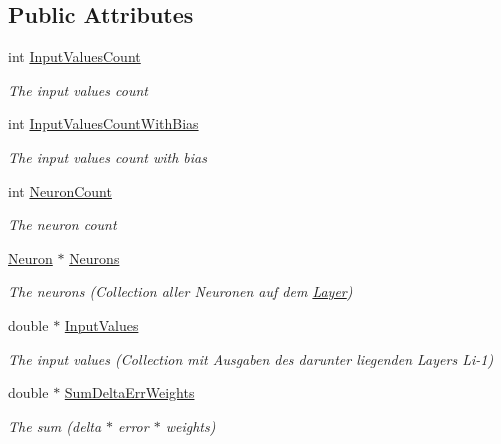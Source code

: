 \subsection*{Public Attributes}
\begin{DoxyCompactItemize}
\item 
int \hyperlink{class_n_n_t_lib_1_1_layer_a5c968ed46039cbaa69f217c71fd74855}{Input\+Values\+Count}
\begin{DoxyCompactList}\small\item\em The input values count \end{DoxyCompactList}\item 
int \hyperlink{class_n_n_t_lib_1_1_layer_a3537c5d904445f7bebac1136c59e0503}{Input\+Values\+Count\+With\+Bias}
\begin{DoxyCompactList}\small\item\em The input values count with bias \end{DoxyCompactList}\item 
int \hyperlink{class_n_n_t_lib_1_1_layer_aba659d85237baa7e0b3ba235d5313da6}{Neuron\+Count}
\begin{DoxyCompactList}\small\item\em The neuron count \end{DoxyCompactList}\item 
\hyperlink{class_n_n_t_lib_1_1_neuron}{Neuron} $\ast$ \hyperlink{class_n_n_t_lib_1_1_layer_ae10597dc8e12d338fe40d902d6f26ef0}{Neurons}
\begin{DoxyCompactList}\small\item\em The neurons (Collection aller Neuronen auf dem \hyperlink{class_n_n_t_lib_1_1_layer}{Layer}) \end{DoxyCompactList}\item 
double $\ast$ \hyperlink{class_n_n_t_lib_1_1_layer_ab269c8597fa1768562515f8b68439b73}{Input\+Values}
\begin{DoxyCompactList}\small\item\em The input values (Collection mit Ausgaben des darunter liegenden Layers Li-\/1) \end{DoxyCompactList}\item 
double $\ast$ \hyperlink{class_n_n_t_lib_1_1_layer_a655484beac27344f2ced3bc77a9f160f}{Sum\+Delta\+Err\+Weights}
\begin{DoxyCompactList}\small\item\em The sum (delta $\ast$ error $\ast$ weights) \end{DoxyCompactList}\end{DoxyCompactItemize}
